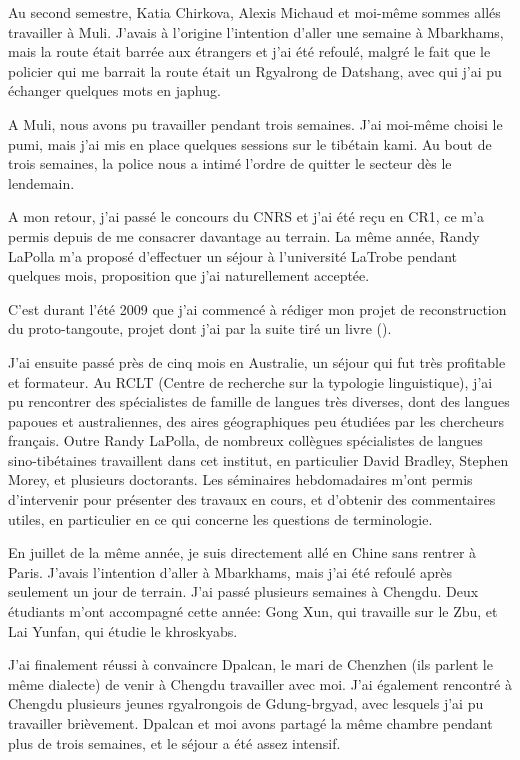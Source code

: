 \documentclass[oldfontcommands,oneside,a4paper,11pt]{memoir}
\begin{document}
Au second semestre, Katia Chirkova, Alexis Michaud et moi-même sommes allés travailler à Muli. J'avais à l'origine l'intention d'aller une semaine à Mbarkhams, mais la route était barrée aux étrangers et j'ai été refoulé, malgré le fait que le policier qui me barrait la route était un Rgyalrong de Datshang, avec qui j'ai pu échanger quelques mots en japhug.

A Muli, nous avons pu travailler pendant trois semaines. J'ai moi-même choisi le pumi, mais j'ai mis en place quelques sessions sur le tibétain kami. Au bout de trois semaines, la police nous a intimé l'ordre de quitter le secteur dès le lendemain.  

A mon retour, j'ai passé le concours du CNRS et j'ai été reçu en CR1, ce m'a permis depuis de me consacrer davantage au terrain. La même année, Randy LaPolla m'a proposé d'effectuer un séjour à l'université LaTrobe pendant quelques mois, proposition que j'ai naturellement acceptée.

C'est durant l'été 2009 que j'ai commencé à rédiger mon projet de reconstruction du proto-tangoute, projet dont j'ai par la suite tiré un livre (\citealt{jacques14esquisse}).

J'ai ensuite passé près de cinq mois en Australie, un séjour qui fut très profitable et formateur. Au RCLT (Centre de recherche sur la typologie linguistique), j'ai pu rencontrer des spécialistes de famille de langues très diverses, dont des langues papoues et australiennes, des aires géographiques peu étudiées par les chercheurs français. Outre Randy LaPolla, de nombreux collègues spécialistes de langues sino-tibétaines travaillent dans cet institut, en particulier David Bradley, Stephen Morey, et plusieurs doctorants. Les séminaires hebdomadaires m'ont permis d'intervenir pour présenter des travaux en cours, et d'obtenir des commentaires utiles, en particulier en ce qui concerne les questions de terminologie.

En juillet de la même année, je suis directement allé en Chine sans rentrer à Paris. J'avais l'intention d'aller à Mbarkhams, mais   j'ai été refoulé après seulement un jour de terrain. J'ai passé plusieurs semaines  à Chengdu. Deux étudiants m'ont accompagné cette année: Gong Xun, qui travaille sur le Zbu, et Lai Yunfan, qui étudie le khroskyabs.

J'ai finalement réussi à convaincre Dpalcan, le mari de Chenzhen (ils parlent le même dialecte) de venir à Chengdu travailler avec moi. J'ai également rencontré à Chengdu plusieurs jeunes rgyalrongois de Gdung-brgyad, avec lesquels j'ai pu travailler brièvement. Dpalcan et moi avons partagé la même chambre pendant plus de trois semaines, et le séjour a été assez intensif.  
\end{document}
